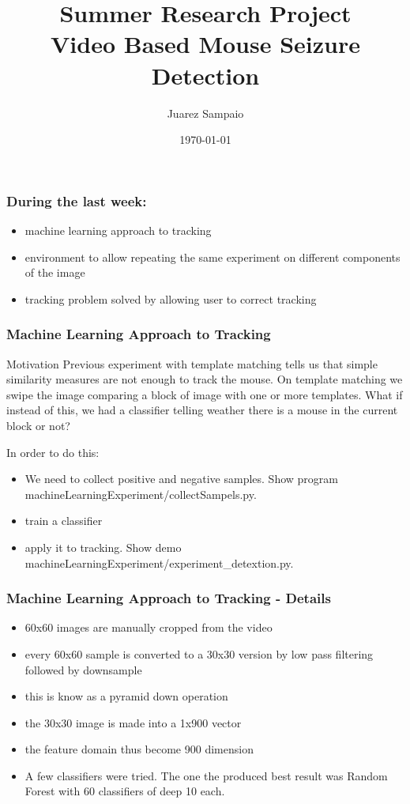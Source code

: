\documentclass{beamer}
\title{Summer Research Project \\  Video Based Mouse Seizure Detection}
\author{Juarez Sampaio}
\institute{Rice University}
\date{\today}
\begin{document}
\begin{frame}
        \titlepage
\end{frame}

\begin{frame}[fragile]
\frametitle{During the last week:}
  \begin{itemize}
     \item machine learning approach to tracking
     \item environment to allow repeating the same experiment on different components of the image
     \item tracking problem solved by allowing user to correct tracking
  \end{itemize}
\end{frame}

\begin{frame}
  \frametitle{Machine Learning Approach to Tracking}
  \begin{block}{Motivation}
        Previous experiment with template matching tells us that simple similarity measures are not enough to track the
        mouse. On template matching we swipe the image comparing a block of image with one or more templates. What if
        instead of this, we had a classifier telling weather there is a mouse in the current block or not?
  \end{block}

  In order to do this:
  \begin{itemize}
      \item We need to collect positive and negative samples. Show program machineLearningExperiment/collectSampels.py.
      \item train a classifier
      \item apply it to tracking. Show demo machineLearningExperiment/experiment\_detextion.py.
    \end{itemize}
\end{frame}


\begin{frame}
  \frametitle{Machine Learning Approach to Tracking - Details}
  \begin{itemize}
      \item 60x60 images are manually cropped from the video
      \item every 60x60 sample is converted to a 30x30 version by low pass filtering followed by downsample
      \item this is know as a pyramid down operation
      \item the 30x30 image is made into a 1x900 vector
      \item the feature domain thus become 900 dimension
      \item A few classifiers were tried. The one the produced best result was Random Forest with 60 classifiers of deep
        10 each.
    \end{itemize}

\end{frame}
\end{document}
